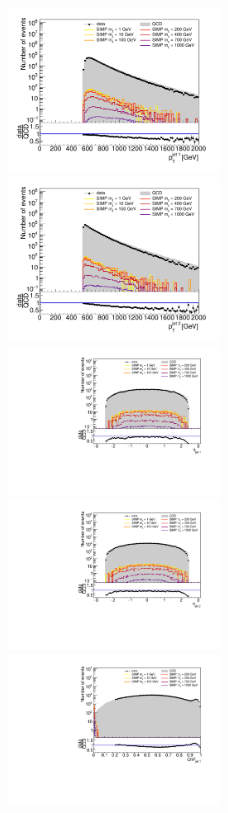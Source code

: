 \begin{figure}[ht]
  \centering
  \includegraphics[width=0.5\textwidth]{figures/jet1_pt_newtrigger}\hfill%
  \includegraphics[width=0.5\textwidth]{figures/jet2_pt_newtrigger}
  \includegraphics[width=0.5\textwidth]{figures/jet1_eta_newtrigger}\hfill%
  \includegraphics[width=0.5\textwidth]{figures/jet2_eta_newtrigger}
  \includegraphics[width=0.5\textwidth]{figures/jet1_chf_newtrigger}\hfill%

\end{figure}
